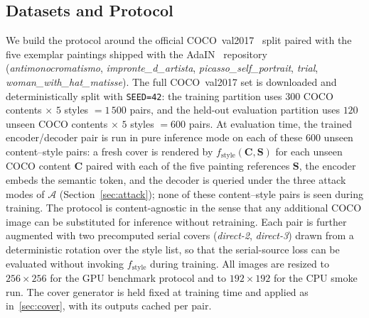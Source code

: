 \documentclass[conference]{IEEEtran}
\begin{document}
\subsection{Datasets and Protocol}
\label{sec:proto}
We build the protocol around the official COCO~val2017~\cite{coco} split paired with the five exemplar paintings shipped with the AdaIN~\cite{adain} repository (\textit{antimonocromatismo}, \textit{impronte\_d\_artista}, \textit{picasso\_self\_portrait}, \textit{trial}, \textit{woman\_with\_hat\_matisse}). The full COCO~val2017 set is downloaded and deterministically split with \texttt{SEED=42}: the training partition uses $300$ COCO contents $\times$ $5$ styles $= 1\,500$ pairs, and the held-out evaluation partition uses $120$ unseen COCO contents $\times$ $5$ styles $= 600$ pairs. At evaluation time, the trained encoder/decoder pair is run in pure inference mode on each of these $600$ unseen content--style pairs: a fresh cover is rendered by $f_{\text{style}}(\mathbf{C},\mathbf{S})$ for each unseen COCO content $\mathbf{C}$ paired with each of the five painting references $\mathbf{S}$, the encoder embeds the semantic token, and the decoder is queried under the three attack modes of $\mathcal{A}$ (Section~\ref{sec:attack}); none of these content--style pairs is seen during training. The protocol is content-agnostic in the sense that any additional COCO image can be substituted for inference without retraining. Each pair is further augmented with two precomputed serial covers (\textit{direct-2}, \textit{direct-3}) drawn from a deterministic rotation over the style list, so that the serial-source loss can be evaluated without invoking $f_{\text{style}}$ during training. All images are resized to $256\!\times\!256$ for the GPU benchmark protocol and to $192\!\times\!192$ for the CPU smoke run. The cover generator is held fixed at training time and applied as in~\ref{sec:cover}, with its outputs cached per pair.
\end{document}

